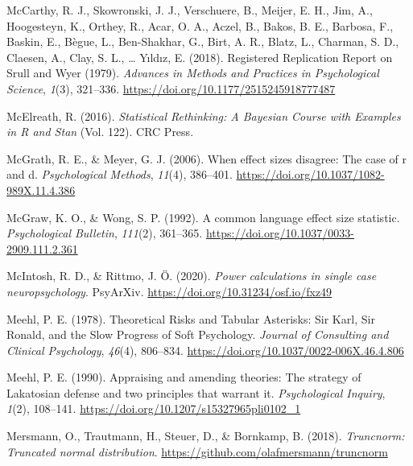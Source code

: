 \documentclass[
  oneside]{krantz}
\newlength{\cslhangindent}
\newlength{\cslentryspacingunit} %
\newenvironment{CSLReferences}[2] %
 {%
  \setlength{\parindent}{0pt}
  \ifodd #1
  \let\oldpar\par
  \def\par{\hangindent=\cslhangindent\oldpar}
  \fi
  \setlength{\parskip}{#2\cslentryspacingunit}
 }%
 {}
\begin{document}
\begin{CSLReferences}{1}{0}
\leavevmode{}%
McCarthy, R. J., Skowronski, J. J., Verschuere, B., Meijer, E. H., Jim,
A., Hoogesteyn, K., Orthey, R., Acar, O. A., Aczel, B., Bakos, B. E.,
Barbosa, F., Baskin, E., Bègue, L., Ben-Shakhar, G., Birt, A. R., Blatz,
L., Charman, S. D., Claesen, A., Clay, S. L., \ldots{} Yıldız, E.
(2018). Registered {Replication Report} on {Srull} and {Wyer} (1979).
\emph{Advances in Methods and Practices in Psychological Science},
\emph{1}(3), 321--336. \url{https://doi.org/10.1177/2515245918777487}

\leavevmode{}%
McElreath, R. (2016). \emph{Statistical {Rethinking}: {A Bayesian
Course} with {Examples} in {R} and {Stan}} (Vol. 122). {CRC Press}.

\leavevmode{}%
McGrath, R. E., \& Meyer, G. J. (2006). When effect sizes disagree:
{The} case of r and d. \emph{Psychological Methods}, \emph{11}(4),
386--401. \url{https://doi.org/10.1037/1082-989X.11.4.386}

\leavevmode{}%
McGraw, K. O., \& Wong, S. P. (1992). A common language effect size
statistic. \emph{Psychological Bulletin}, \emph{111}(2), 361--365.
\url{https://doi.org/10.1037/0033-2909.111.2.361}

\leavevmode{}%
McIntosh, R. D., \& Rittmo, J. Ö. (2020). \emph{Power calculations in
single case neuropsychology}. {PsyArXiv}.
\url{https://doi.org/10.31234/osf.io/fxz49}

\leavevmode{}%
Meehl, P. E. (1978). Theoretical {Risks} and {Tabular Asterisks}: {Sir
Karl}, {Sir Ronald}, and the {Slow Progress} of {Soft Psychology}.
\emph{Journal of Consulting and Clinical Psychology}, \emph{46}(4),
806--834. \url{https://doi.org/10.1037/0022-006X.46.4.806}

\leavevmode{}%
Meehl, P. E. (1990). Appraising and amending theories: {The} strategy of
{Lakatosian} defense and two principles that warrant it.
\emph{Psychological Inquiry}, \emph{1}(2), 108--141.
\url{https://doi.org/10.1207/s15327965pli0102_1}

\leavevmode{}%
Mersmann, O., Trautmann, H., Steuer, D., \& Bornkamp, B. (2018).
\emph{Truncnorm: Truncated normal distribution}.
\url{https://github.com/olafmersmann/truncnorm}


\end{CSLReferences}
\end{document}
